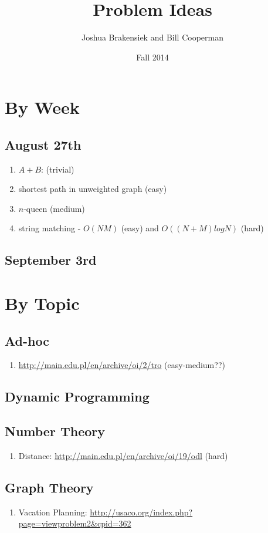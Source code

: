 \documentclass{article}
\title{Problem Ideas}
\author{Joshua Brakensiek and Bill Cooperman}
\date{Fall 2014}
\begin{document}
\maketitle

\section{By Week}

\subsection{August 27th}

\begin{enumerate}
\item $A + B$:  (trivial)
\item shortest path in unweighted graph (easy)
\item $n$-queen (medium)
\item string matching - $O(NM)$ (easy) and $O((N + M) log N)$ (hard)
\end{enumerate}

\subsection{September 3rd}

\section{By Topic}

\subsection{Ad-hoc}
\begin{enumerate}
\item \url{http://main.edu.pl/en/archive/oi/2/tro} (easy-medium??)
\end{enumerate}

\subsection{Dynamic Programming}
\subsection{Number Theory}
\begin{enumerate}
\item  Distance: \url{http://main.edu.pl/en/archive/oi/19/odl} (hard)
\end{enumerate}
\subsection{Graph Theory}
\begin{enumerate}
\item Vacation Planning: \url{http://usaco.org/index.php?page=viewproblem2&cpid=362}
\end{enumerate}
\end{document}
